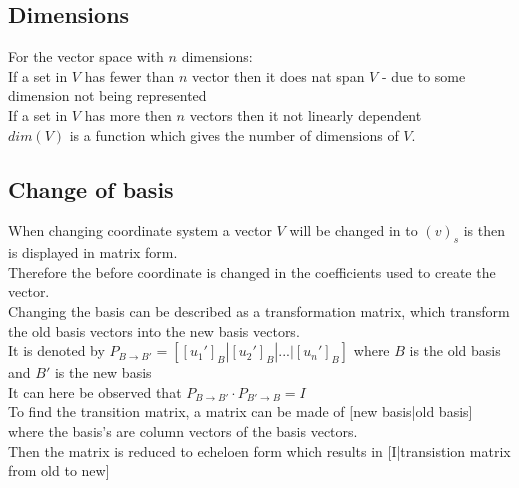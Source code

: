 \documentclass[12pt, a4paper]{article}
\begin{document}
		\subsection{Dimensions}
			For the vector space with $n$ dimensions:\\
			If a set in $V$ has fewer than $n$ vector then it does nat span $V$ - due to some dimension not being represented\\
			If a set in $V$ has more then $n$ vectors then it not linearly dependent \\
			$dim(V)$ is a function which gives the number of dimensions of $V$.\\
		\subsection{Change of basis}
			When changing coordinate system a vector $V$ will be changed in to $(v)_s$ is then is displayed in matrix form.\\
			Therefore the before coordinate is changed in the coefficients used to create the vector.\\
			Changing the basis can be described as a transformation matrix, which transform the old basis vectors into the new basis vectors.\\
			It is denoted by $P_{B\rightarrow B'}=[[u_1']_B|[u_2']_B|...|[u_n']_B]$ where $B$ is the old basis and $B'$ is the new basis\\
			It can here be observed that $P_{B\rightarrow B'}\cdot P_{B'\rightarrow B}=I$\\
			To find the transition matrix, a matrix can be made of [new basis|old basis] where the basis's are column vectors of the basis vectors.\\
			Then the matrix is reduced to echeloen form which results in [I|transistion matrix from old to new]
\end{document}

